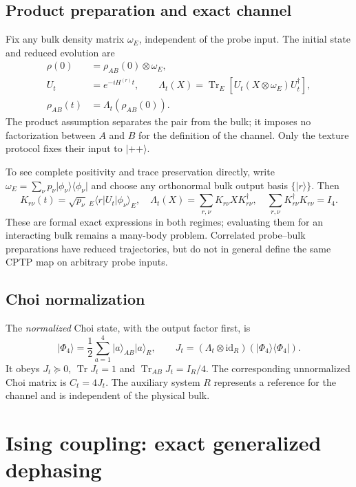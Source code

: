 \documentclass[11pt,a4paper]{article}
\newcommand{\ket}[1]{\lvert #1\rangle}
\newcommand{\bra}[1]{\langle #1\rvert}
\newcommand{\Tr}{\operatorname{Tr}}
\newcommand{\id}{\mathrm{id}}
\begin{document}
\subsection{Product preparation and exact channel}

Fix any bulk density matrix $\omega_E$, independent of the probe input.
The initial state and reduced evolution are
\begin{align}
 \rho(0)&=\rho_{AB}(0)\otimes\omega_E,\\
 U_t&=e^{-iH^{(r)}t},\qquad
 \Lambda_t(X)=\Tr_E[U_t(X\otimes\omega_E)U_t^\dagger],
 \label{eq:channel}\\
 \rho_{AB}(t)&=\Lambda_t(\rho_{AB}(0)).
\end{align}
The product assumption separates the pair from the bulk; it imposes no
factorization between $A$ and $B$ for the definition of the channel.
Only the texture protocol fixes their input to $\ket{++}$.

To see complete positivity and trace preservation directly, write
$\omega_E=\sum_\nu p_\nu\ket{\phi_\nu}\bra{\phi_\nu}$ and choose any
orthonormal bulk output basis $\{\ket r\}$. Then
\begin{equation}
 K_{r\nu}(t)=\sqrt{p_\nu}\,{}_E\bra r U_t\ket{\phi_\nu}_E,
 \quad \Lambda_t(X)=\sum_{r,\nu}K_{r\nu}XK_{r\nu}^\dagger,
 \quad \sum_{r,\nu}K_{r\nu}^\dagger K_{r\nu}=I_4.
 \label{eq:kraus}
\end{equation}
These are formal exact expressions in both regimes; evaluating them for
an interacting bulk remains a many-body problem. Correlated probe--bulk
preparations have reduced trajectories, but do not in general define
the same CPTP map on arbitrary probe inputs.

\subsection{Choi normalization}

The \emph{normalized} Choi state, with the output factor first, is
\begin{equation}
 \ket{\Phi_4}=\frac12\sum_{a=1}^4\ket a_{AB}\ket a_R,
 \qquad J_t=(\Lambda_t\otimes\id_R)(\ket{\Phi_4}\bra{\Phi_4}).
 \label{eq:choi}
\end{equation}
It obeys $J_t\succeq0$, $\Tr J_t=1$ and
$\Tr_{AB}J_t=I_R/4$. The corresponding unnormalized Choi matrix is
$C_t=4J_t$. The auxiliary system $R$ represents a reference for the
channel and is independent of the physical bulk.

\section{Ising coupling: exact generalized dephasing}
\label{sec:zz}
\end{document}
